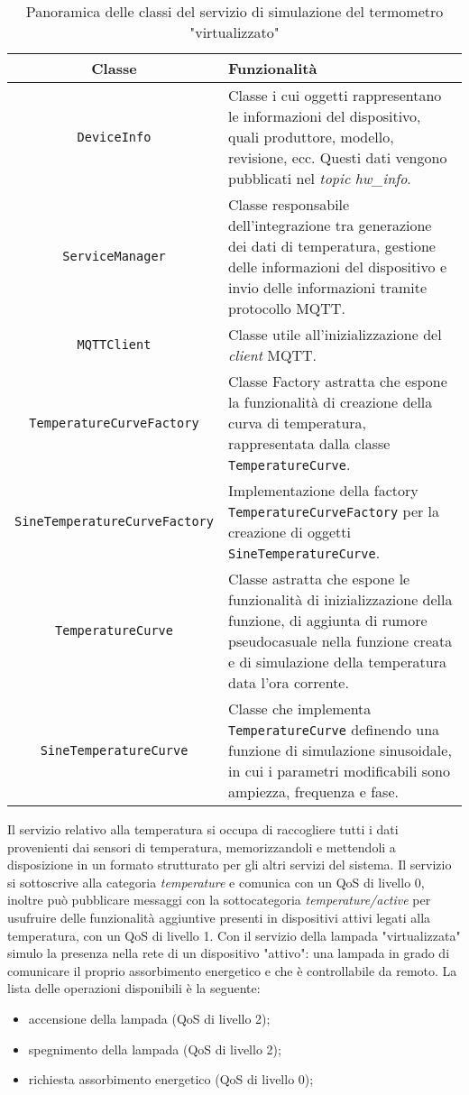 \begin{table}[!h]
\caption{Panoramica delle classi del servizio di simulazione del termometro "virtualizzato"}
\label{tab:classi-termometro}
\begin{tabularx}{\linewidth}{|c|X|}
\hline
\textbf{Classe} & \textbf{Funzionalità} \\
\hline
\texttt{DeviceInfo} & Classe i cui oggetti rappresentano le informazioni del dispositivo, quali produttore, modello, revisione, ecc. Questi dati vengono pubblicati nel \emph{topic} \emph{hw\_info}. \\
\hline
\texttt{ServiceManager} & Classe responsabile dell'integrazione tra generazione dei dati di temperatura, gestione delle informazioni del dispositivo e invio delle informazioni tramite protocollo MQTT. \\
\hline
\texttt{MQTTClient} & Classe utile all'inizializzazione del \emph{client} MQTT. \\
\hline
\texttt{TemperatureCurveFactory} & Classe Factory astratta che espone la funzionalità di creazione della curva di temperatura, rappresentata dalla classe \texttt{TemperatureCurve}. \\
\hline
\texttt{SineTemperatureCurveFactory} & Implementazione della factory \texttt{TemperatureCurveFactory} per la creazione di oggetti \texttt{SineTemperatureCurve}. \\
\hline
\texttt{TemperatureCurve} & Classe astratta che espone le funzionalità di inizializzazione della funzione, di aggiunta di rumore pseudocasuale nella funzione creata e di simulazione della temperatura data l'ora corrente. \\
\hline
\texttt{SineTemperatureCurve} & Classe che implementa \texttt{TemperatureCurve} definendo una funzione di simulazione sinusoidale, in cui i parametri modificabili sono ampiezza, frequenza e fase. \\
\hline
\end{tabularx}
\end{table}


Il servizio relativo alla temperatura si occupa di raccogliere tutti i dati provenienti dai sensori di temperatura, memorizzandoli e mettendoli a disposizione in un formato strutturato per gli altri servizi del sistema.
Il servizio si sottoscrive alla categoria \emph{temperature} e comunica con un QoS di livello 0, inoltre può pubblicare messaggi con la sottocategoria \emph{temperature/active} per usufruire delle funzionalità aggiuntive presenti in dispositivi attivi legati alla temperatura, con un QoS di livello 1.
Con il servizio della lampada "virtualizzata" simulo la presenza nella rete di un dispositivo "attivo": una lampada in grado di comunicare il proprio assorbimento energetico e che è controllabile da remoto.
La lista delle operazioni disponibili è la seguente:
\begin{itemize}
	\item accensione della lampada (QoS di livello 2);
	\item spegnimento della lampada (QoS di livello 2);
	\item richiesta assorbimento energetico (QoS di livello 0);
\end{itemize}

